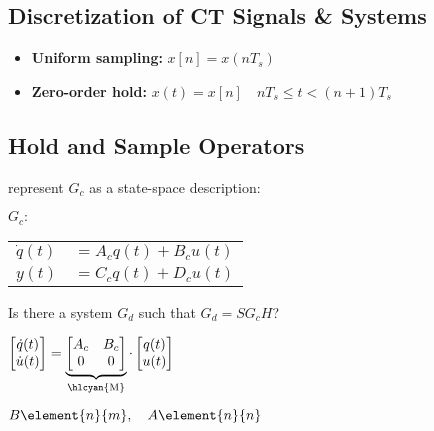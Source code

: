 \documentclass[8pt,a4paper]{scrartcl}
\begin{document}
\begin{multicols*}{3}
\section{Discretization of CT Signals \& Systems}

\begin{itemize}
\item\textbf{Uniform sampling:} $x[n]=x(nT_s)$


\item\textbf{Zero-order hold:} $x(t)=x[n]\quad nT_s\leq t<(n+1)T_s$

\end{itemize}

\subsection{Hold and Sample Operators}


represent $G_c$ as a state-space description:

$G_c:$\begin{tabular}{ll}$\dot{q}(t)$&$=A_cq(t)+B_cu(t)$\\$y(t)$&$=C_cq(t)+D_cu(t)$\end{tabular}


Is there a system $G_d$ such that $G_d=SG_cH$?


\begin{center}
$\begin{bmatrix}\dot{q}(t)\\\dot{u}(t)\end{bmatrix}=\underbrace{\begin{bmatrix}A_c&B_c\\0&0\end{bmatrix}}_\text{\hlcyan{M}}\cdot\begin{bmatrix}q(t)\\u(t)\end{bmatrix}$

$B\element{n}{m},\quad A\element{n}{n}$
\end{center}


\end{multicols*}
\end{document}
